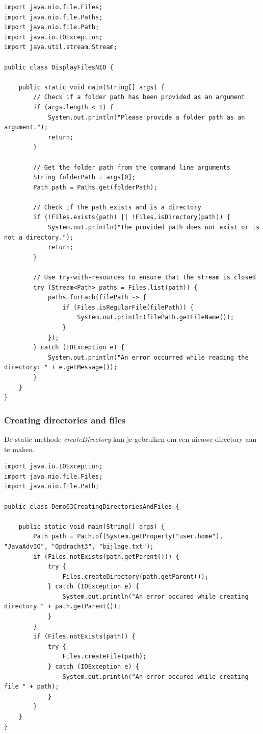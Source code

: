 \begin{lstlisting}
import java.nio.file.Files;
import java.nio.file.Paths;
import java.nio.file.Path;
import java.io.IOException;
import java.util.stream.Stream;

public class DisplayFilesNIO {

    public static void main(String[] args) {
        // Check if a folder path has been provided as an argument
        if (args.length < 1) {
            System.out.println("Please provide a folder path as an argument.");
            return;
        }

        // Get the folder path from the command line arguments
        String folderPath = args[0];
        Path path = Paths.get(folderPath);

        // Check if the path exists and is a directory
        if (!Files.exists(path) || !Files.isDirectory(path)) {
            System.out.println("The provided path does not exist or is not a directory.");
            return;
        }

        // Use try-with-resources to ensure that the stream is closed
        try (Stream<Path> paths = Files.list(path)) {
            paths.forEach(filePath -> {
                if (Files.isRegularFile(filePath)) {
                    System.out.println(filePath.getFileName());
                }
            });
        } catch (IOException e) {
            System.out.println("An error occurred while reading the directory: " + e.getMessage());
        }
    }
}
\end{lstlisting}


\subsubsection{Creating directories and files}

De static methode \textit{createDirectory} kan je gebruiken om een nieuwe directory aan te maken. 

\begin{lstlisting}
import java.io.IOException;
import java.nio.file.Files;
import java.nio.file.Path;

public class Demo03CreatingDirectoriesAndFiles {

	public static void main(String[] args) {
		Path path = Path.of(System.getProperty("user.home"), "JavaAdvIO", "Opdracht3", "bijlage.txt");
		if (Files.notExists(path.getParent())) {
			try {
				Files.createDirectory(path.getParent());
			} catch (IOException e) {
				System.out.println("An error occured while creating directory " + path.getParent());
			}
		}
		if (Files.notExists(path)) {
			try {
				Files.createFile(path);
			} catch (IOException e) {
				System.out.println("An error occured while creating file " + path);
			}
		}
	}
}
\end{lstlisting}


